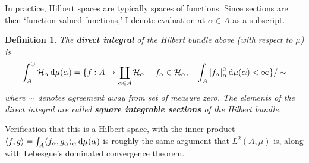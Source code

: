 \documentclass[11pt]{amsart}
\newtheorem{defn}{Definition}
\renewcommand{\H}{\mathcal{H}}
\begin{document}
\begin{remark}
	In practice, Hilbert spaces are typically spaces of functions. Since sections are then `function valued functions,' I denote evaluation at $\alpha \in A$ as a subscript.
\end{remark}

\begin{defn}
The {\bf direct integral} of the Hilbert bundle above (with respect to $\mu$) is 
	\begin{align*}
		\int^{\oplus}_{A}\H_{\alpha}\dop \mu(\alpha)= \{ f: A \to \coprod_{\alpha\in A} \H_{\alpha}| \quad f_{\alpha}\in\H_{\alpha}, \quad \int_{A}|f_{\alpha}|^{2}_{\alpha}\dop \mu(\alpha)<\infty\} / \sim
	\end{align*}
where $\sim$ denotes agreement away from set of measure zero. The elements of the direct integral are called {\bf square integrable sections} of the Hilbert bundle. 
\end{defn}
Verification that this is a Hilbert space, with the inner product $\langle f, g \rangle=\int_{A}\langle f_{\alpha}, g_{\alpha} \rangle_{\alpha}\,{\rm d} \mu (\alpha)$ is roughly the same argument that $L^{2}(A,\mu)$ is, along with Lebesgue's dominated convergence theorem.
\end{document}
